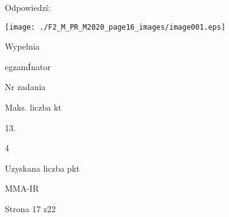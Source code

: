 \documentclass[a4paper,12pt]{article}
\begin{document}
Odpowiedzí:
\begin{center}
\texttt{[image: ./F2\_M\_PR\_M2020\_page16\_images/image001.eps]}
\end{center}
Wypelnia

egzamÍnator

Nr zadania

Maks. liczba kt

13.

4

Uzyskana liczba pkt

MMA-IR

Strona 17 z22
\end{document}
